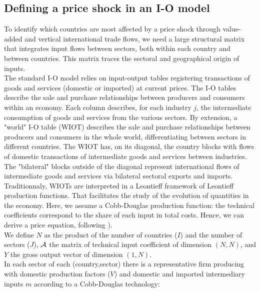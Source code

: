 \documentclass[11pt,a4paper]{article}
\begin{document}
\subsection{Defining a price shock in an I-O model}\label{subsec:ioprice}
To identify which countries are most affected by a price shock through value-added and vertical international trade flows, we need a large structural matrix that integrates input flows between sectors, both within each country and between countries.
This matrix traces the sectoral and geographical origin of inputs. \\
The standard I-O model relies on input-output tables registering transactions of goods and services (domestic or imported) at current prices. The I-O tables describe the sale and purchase relationships between producers and consumers within an economy. Each column describes, for each industry $j$, the intermediate consumption of goods and services from the various sectors.
By extension, a "world" I-O table (WIOT) describes the sale and purchase relationships between producers and consumers in the whole world, differentiating between sectors in different countries.
The WIOT has, on its diagonal, the country blocks with flows of domestic transactions of intermediate goods and services between industries.
The "bilateral" blocks outside of the diagonal represent international flows of intermediate goods and services via bilateral sectoral exports and imports. \\
Traditionnaly, WIOTs are interpreted in a Leontieff framework of Leontieff production functions. That facilitates the study of the evolution of quantities in the economy. 
Here, we assume a Cobb-Douglas production function: the technical coefficients correspond to the share of each input in total costs. 
Hence, we can derive a price equation, following \citep{DeSoyres2018}).\\
We define $N$ as the product of the number of countries ($I$) and the number of sectors ($J$), $\cal A$ the matrix of technical input coefficient of dimension $(N, N)$, and $Y$ the gross output vector of dimension $(1, N)$. \\
In each sector of each (country,sector) there is a representative firm producing with domestic production factors ($V$) and domestic and imported intermediary inputs $m$ according to a Cobb-Douglas technology:
\end{document}
